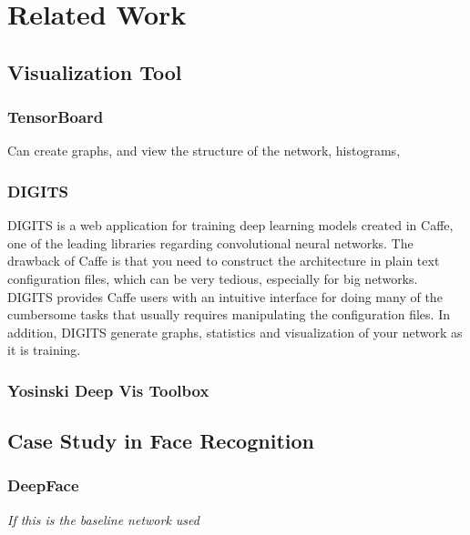 
\chapter{Related Work}

\section{Visualization Tool}


\subsection{TensorBoard}

Can create graphs, and view the structure of the network, histograms, 

\subsection{DIGITS}

DIGITS is a web application for training deep learning models created in Caffe, one of the leading libraries regarding convolutional neural networks. The drawback of Caffe is that you need to construct the architecture in plain text configuration files, which can be very tedious, especially for big networks. DIGITS provides Caffe users with an intuitive interface for doing many of the cumbersome tasks that usually requires manipulating the configuration files. In addition, DIGITS generate graphs, statistics and visualization of your network as it is training.

\subsection{Yosinski Deep Vis Toolbox}

\section{Case Study in Face Recognition}

\subsection{DeepFace}

\textit{If this is the baseline network used}

\cleardoublepage